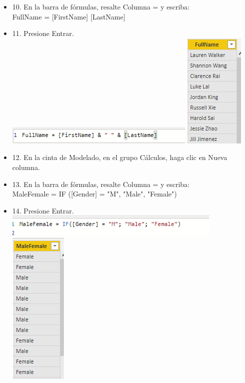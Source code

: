 \begin{itemize}
\item 10. En la barra de fórmulas, resalte Columna = y escriba: \\
FullName = [FirstName] [LastName] \\

\item 11. Presione Entrar. \\

\includegraphics[scale=0.5]{./Imagenes/image020}
\includegraphics[scale=0.5]{./Imagenes/image021}

\item 12. En la cinta de Modelado, en el grupo Cálculos, haga clic en Nueva columna.
\item 13. En la barra de fórmulas, resalte Columna = y escriba:\\
MaleFemale = IF ([Gender] = "M", "Male", "Female")

\item14. Presione Entrar.\\
\includegraphics[scale=0.5]{./Imagenes/image022}
\includegraphics[scale=0.5]{./Imagenes/image023}


\end{itemize}
